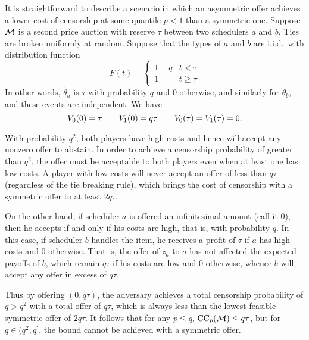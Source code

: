 \begin{example}
  \label{asymmetric-offer}

  It is straightforward to describe a scenario in which an asymmetric offer achieves a lower cost of censorship at some quantile $p<1$ than a symmetric one.
  Suppose $\mathcal{M}$ is a second price auction with reserve $\tau$ between two schedulers $a$ and $b$.
  Ties are broken uniformly at random.
  Suppose that the types of $a$ and $b$ are i.i.d.~with distribution function
  \[
    F(t) = \left\{\begin{array}{ll}
      1-q & t<\tau \\
      1 & t \geq\tau
    \end{array}\right.
  \]
  In other words, $\tilde\theta_a$ is $\tau$ with probability $q$ and $0$ otherwise, and similarly for $\tilde\theta_b$, and these events are independent.
  We have
  \[
    V_0(0) = \tau \qquad V_1(0) = q\tau  \qquad V_0(\tau) = V_1(\tau) = 0.
  \]

  With probability $q^2$, both players have high costs and hence will accept any nonzero offer to abstain.
  In order to achieve a censorship probability of greater than $q^2$, the offer must be acceptable to both players even when at least one has low costs.
  A player with low costs will never accept an offer of less than $q\tau$ (regardless of the tie breaking rule), which brings the cost of censorship with a symmetric offer to at least $2q\tau$.

  On the other hand, if scheduler $a$ is offered an infinitesimal amount (call it $0$), then he accepts if and only if his costs are high, that is, with probability $q$.
  In this case, if scheduler $b$ handles the item, he receives a profit of $\tau$ if $a$ has high costs and $0$ otherwise.
  That is, the offer of $z_a$ to $a$ has not affected the expected payoffs of $b$, which remain $q\tau$ if his costs are low and $0$ otherwise, whence $b$ will accept any offer in excess of $q\tau$.

  Thus by offering $(0,q\tau)$, the adversary achieves a total censorship probability of $q>q^2$ with a total offer of $q\tau$, which is always less than the lowest feasible symmetric offer of $2q\tau$.
  It follows that for any $p\leq q$, $\mathrm{CC}_{p}(\mathcal{M})\leq q\tau$, but for $q\in(q^2,q]$, the bound cannot be achieved with a symmetric offer.

\end{example}



